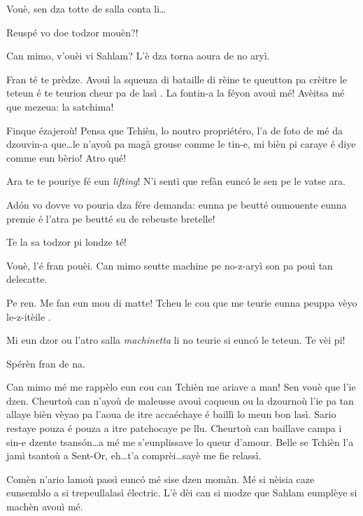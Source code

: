 \begin{drama}
\Piccinaspeaks Vouè, sen dza totte de salla conta li\ldots

\Tzardounspeaks Reuspé vo doe todzor mouèn?!

\Cobraspeaks Can mimo, v'ouèi vi Sahlam? L’è dza torna aoura de no aryì.

\Piccinaspeaks Fran té te prèdze. Avouì la squeuza di bataille di rèine te queutton pa crèitre le teteun é te teurion cheur pa de lasì \latte . La fontin-a la féyon avouì mé!  Avèitsa mé que mezeua: la satchima!

\Tzardounspeaks Finque ézajeroù! Pensa que Tchièn, lo noutro propriétéro, l’a de foto de mé da dzouvin-a que\ldots le n’ayoù pa magà grouse comme le tin-e, mi bièn pi caraye é diye comme eun bèrio! Atro qué!


\Piccinaspeaks  {} Ara te te pouriye fé eun \textit{lifting}! N’i sentì que refàn eunc\'o le sen pe le vatse ara.
 

\Tzardounspeaks Ad\'on vo dovve vo pouria dza fére demanda: eunna  pe beutté oumouente eunna premie é l’atra pe beutté su de rebeuste bretelle!

\Piccinaspeaks Te la sa todzor pi londze té! 

\Tzardounspeaks Vouè, l’é fran pouèi. Can mimo seutte machine pe no-z-aryì son pa pouì tan delecatte.

\Piccinaspeaks Pe ren. Me fan eun mou di matte! Tcheu le cou que me teurie eunna peuppa vèyo le-z-itèile \stella \dolore \stella \dolore \stella .

\Tzardounspeaks Mi eun dzor ou l’atro salla \textit{machinetta} li no teurie si eunc\'o le teteun. Te vèi pi!

\Piccinaspeaks Spérèn fran de na.

\Tzardounspeaks Can mimo mé me rappèlo eun cou can Tchièn me ariave a man! Sen vouè que l'ie dzen. Cheurtoù can n’ayoù de maleusse avouì caqueun ou la dzournoù l'ie pa tan allaye bièn vèyao pa l’aoua de itre accaéchaye é baillì lo meun bon lasì. Sario restaye pouza é pouza a itre patchocaye pe llu. Cheurtoù can baillave campa i sin-e dzente tsans\'on\ldots a mé me s’eunplissave lo queur d’amour. Belle se Tchièn l’a jamì tsantoù a Sent-Or,  eh\ldots t’a comprèi\ldots sayè me fie relassì.

\Piccinaspeaks Comèn n’ario lamoù passì eunc\'o mé sise dzen momàn. Mé si nèisia caze eunsemblo a si trepeullalasì électric. L’è dèi can si modze que Sahlam eumplèye si machèn avouì mé.


\end{drama}
